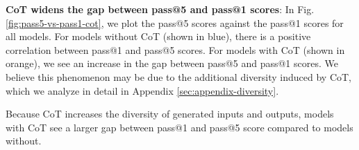 \documentclass{article}
\begin{document}
\textbf{CoT widens the gap between pass@5 and pass@1 scores}: In Fig. \ref{fig:pass5-vs-pass1-cot}, we plot the pass@5 scores against the pass@1 scores for all models. For models without CoT (shown in blue), there is a positive correlation between pass@1 and pass@5 scores. For models with CoT (shown in orange), we see an increase in the gap between pass@5 and pass@1 scores. We believe this phenomenon may be due to the additional diversity induced by CoT, which we analyze in detail in Appendix \ref{sec:appendix-diversity}.

\begin{tcolorbox}[colback=lightgreen, boxrule=0pt, arc=10pt, outer arc=10pt]
Because CoT increases the diversity of generated inputs and outputs, models with CoT see a larger gap between pass@1 and pass@5 score compared to models without.
\end{tcolorbox}
\end{document}
